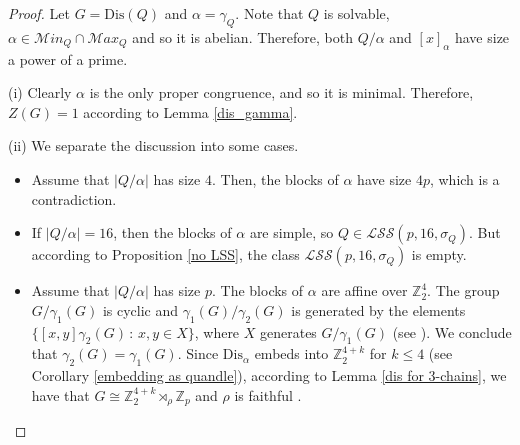 \documentclass[a4paper, english, 9pt]{amsart}
\theoremstyle{plain}
\theoremstyle{definition}
\def\dis{\mathrm{Dis}}
\def\setof#1#2{\{#1\,\colon\,#2\}}
\def\Z{\mathbb Z}
\def\N{\mathrm{Norm}}
\def\Ma{\mathcal Max}
\def\ma{\mathcal Min}
\def\LSS{\mathcal{LSS}}
\begin{document}
\begin{proof}
%

Let $G=\dis(Q)$ and $\alpha=\gamma_Q$. Note that $Q$ is solvable, $\alpha\in \ma_Q\cap\Ma_Q$ and so it is abelian. Therefore, both $Q/\alpha$ and $[x]_\alpha$ have size a power of a prime.

(i) Clearly $\alpha$ is the only proper congruence, and so it is minimal. Therefore, $Z(G)=1$ according to Lemma \ref{dis_gamma}.

(ii) We separate the discussion into some cases.

\begin{itemize}
    \item Assume that $|Q/\alpha|$ has size $4$. Then, the blocks of $\alpha$ have size $4p$, which is a contradiction. %


\item If $|Q/\alpha|=16$, then the blocks of $\alpha$ are simple, so $Q\in \LSS(p,16,\sigma_Q)$. But according to Proposition \ref{no LSS}, the class $\LSS(p,16,\sigma_Q)$ is empty.


\item Assume that $|Q/\alpha|$ has size $p$. The blocks of $\alpha$ are affine over $\Z_2^4$. 
The group $G/\gamma_1(G)$ is cyclic and $\gamma_1(G)/\gamma_2(G)$ is generated by the elements $\setof{[x,y]\gamma_2(G)}{x,y\in X}$, where $X$ generates $G/\gamma_1(G)$ (see \cite[Proposition 9.2.5]{Sims}). We conclude that $\gamma_2(G)=\gamma_1(G)$. Since $\dis_{\alpha}$ embeds into $\Z_2^{4+k}$ for $k\leq 4$ (see Corollary \ref{embedding as quandle}), according to Lemma \ref{dis for 3-chains}, we have that $G\cong \Z_2^{4+k}\rtimes_\rho \Z_p$ and $\rho$ is faithful .%
\end{itemize}



\end{proof}
\end{document}

